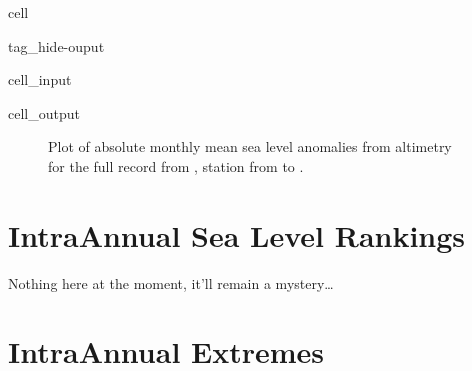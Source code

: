 \documentclass[letterpaper,10pt,english]{jupyterBook}
\begin{document}
\begin{sphinxuseclass}{cell}
\begin{sphinxuseclass}{tag_hide-ouput}
\begin{sphinxVerbatimInput}
\begin{sphinxuseclass}{cell_input}
\end{sphinxuseclass}\end{sphinxVerbatimInput}
\begin{sphinxVerbatimOutput}

\begin{sphinxuseclass}{cell_output}
\noindent{}

\end{sphinxuseclass}\end{sphinxVerbatimOutput}

\end{sphinxuseclass}
\end{sphinxuseclass}
\begin{figure}[htbp]
\centering
\capstart

\noindent{}
\caption{Plot of absolute monthly mean sea level anomalies from altimetry for the full record from ,  station from  to .}\label{\detokenize{notebooks/regional_and_local/SL_anomaly_intra-annual:sl-anomaly-timeseries}}\end{figure}

\sphinxstepscope


\part{Intra\sphinxhyphen{}Annual Sea Level Rankings}
\label{\detokenize{notebooks/regional_and_local/SL_Rankings_intra-annual:intra-annual-sea-level-rankings}}\label{\detokenize{notebooks/regional_and_local/SL_Rankings_intra-annual::doc}}
\sphinxAtStartPar
Nothing here at the moment, it’ll remain a mystery…

\sphinxAtStartPar
{}

\sphinxstepscope


\part{Intra\sphinxhyphen{}Annual Extremes}
\label{\detokenize{notebooks/regional_and_local/SL_Extremes_intra-annual:intra-annual-extremes}}\label{\detokenize{notebooks/regional_and_local/SL_Extremes_intra-annual::doc}}
\sphinxstepscope
\end{document}
